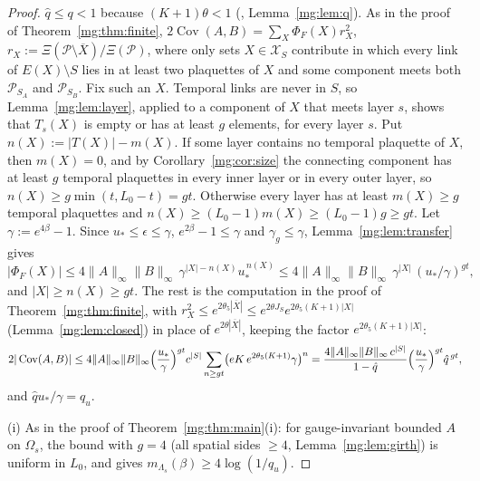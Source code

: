 \documentclass[11pt,a4paper]{article}
\theoremstyle{definition}
\theoremstyle{remark}
\DeclareMathOperator{\Cov}{Cov}
\newcommand{\cP}{\mathcal{P}}
\newcommand{\cX}{\mathcal{X}}
\newcommand{\norm}[1]{\lVert #1\rVert}
\newcommand{\Flab}[2]{\cite[#1 \texttt{#2}]{F}}
\newcommand{\IIIlab}[2]{\cite[#1 \texttt{#2}]{III}}
\begin{document}
\begin{proof}
$\hat q\le q<1$ because $(K+1)\theta<1$ (\IIIlab{Lemma}{al:lem:constants}, Lemma~\ref{mg:lem:q}). As in the proof of
Theorem~\ref{mg:thm:finite}, $2\Cov(A,B)=\sum_X\Phi_F(X)r_X^2$, $r_X:=\Xi(\cP\setminus\overline X)/\Xi(\cP)$, where only sets $X\in\cX_S$
contribute in which every link of $E(X)\setminus S$ lies in at least two plaquettes of $X$ and some component meets both $\cP_{S_A}$ and
$\cP_{S_B}$. Fix such an $X$. Temporal links are never in $S$, so Lemma~\ref{mg:lem:layer}, applied to a component of $X$ that meets layer $s$, shows
that $T_s(X)$ is empty or has at least $g$ elements, for every layer $s$. Put
$n(X):=|T(X)|-m(X)$. If some layer contains no temporal plaquette of $X$, then $m(X)=0$, and by Corollary~\ref{mg:cor:size} the connecting
component has at least $g$ temporal plaquettes in every inner layer or in every outer layer, so $n(X)\ge g\min(t,L_0-t)=gt$. Otherwise every
layer has at least $m(X)\ge g$ temporal plaquettes and $n(X)\ge(L_0-1)m(X)\ge(L_0-1)g\ge gt$. Let $\gamma:=e^{4\beta}-1$. Since $u_*\le\epsilon\le\gamma$,
$e^{2\beta}-1\le\gamma$ and $\gamma_g\le\gamma$, Lemma~\ref{mg:lem:transfer} gives
\[
|\Phi_F(X)|\le4\norm A_\infty\norm B_\infty\,\gamma^{|X|-n(X)}u_*^{\,n(X)}\le4\norm A_\infty\norm B_\infty\,\gamma^{|X|}\,(u_*/\gamma)^{gt},
\]
and $|X|\ge n(X)\ge gt$. The rest is the computation in the proof of Theorem~\ref{mg:thm:finite}, with $r_X^2\le e^{2\theta_5|\overline X|}\le e^{2\theta J_S}e^{2\theta_5(K+1)|X|}$
(Lemma~\ref{mg:lem:closed}) in place of $e^{2\theta|\overline X|}$, keeping the factor $e^{2\theta_5(K+1)|X|}$:
\[
2|\Cov(A,B)|\le4\norm A_\infty\norm B_\infty\Bigl(\frac{u_*}\gamma\Bigr)^{gt}c^{|S|}\sum_{n\ge gt}\bigl(eK\,e^{2\theta_5(K+1)}\gamma\bigr)^n
=\frac{4\norm A_\infty\norm B_\infty\,c^{|S|}}{1-\hat q}\Bigl(\frac{u_*}\gamma\Bigr)^{gt}\hat q^{\,gt},
\]
and $\hat qu_*/\gamma=q_u$.

(i) As in the proof of Theorem~\ref{mg:thm:main}(i): for gauge-invariant bounded $A$ on $\Omega_s$, the bound with $g=4$ (all spatial sides
$\ge4$, Lemma~\ref{mg:lem:girth}) is uniform in $L_0$, and \Flab{Corollary}{cor:gapfromcorr} gives $m_{\Lambda_s}(\beta)\ge4\log(1/q_u)$.


\end{proof}
\end{document}
